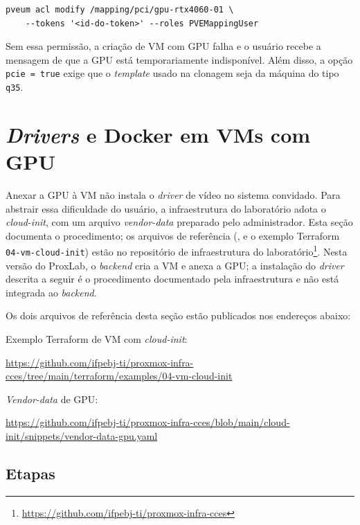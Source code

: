 \medskip
\noindent\begin{minipage}{\textwidth}
\footnotesize
\begin{verbatim}
pveum acl modify /mapping/pci/gpu-rtx4060-01 \
    --tokens '<id-do-token>' --roles PVEMappingUser
\end{verbatim}
\end{minipage}
\medskip

Sem essa permissão, a criação de VM com GPU falha e o usuário recebe a mensagem de que a GPU está temporariamente indisponível. Além disso, a opção \texttt{pcie = true} exige que o \textit{template} usado na clonagem seja da máquina do tipo \texttt{q35}.

\section{\textit{Drivers} e Docker em VMs com GPU}

Anexar a GPU à VM não instala o \textit{driver} de vídeo no sistema convidado. Para abstrair essa dificuldade do usuário, a infraestrutura do laboratório adota o \textit{cloud-init}, com um arquivo \textit{vendor-data} preparado pelo administrador. Esta seção documenta o procedimento; os arquivos de referência (,  e o exemplo Terraform \texttt{04-vm-cloud-init}) estão no repositório de infraestrutura do laboratório\footnote{\url{https://github.com/ifpebj-ti/proxmox-infra-cces}}. Nesta versão do ProxLab, o \textit{backend} cria a VM e anexa a GPU; a instalação do \textit{driver} descrita a seguir é o procedimento documentado pela infraestrutura e não está integrada ao \textit{backend}.

Os dois arquivos de referência desta seção estão publicados nos endereços abaixo:

\par Exemplo Terraform de VM com \textit{cloud-init}:
{\small\begin{center}
\url{https://github.com/ifpebj-ti/proxmox-infra-cces/tree/main/terraform/examples/04-vm-cloud-init}
\end{center}}

\par \textit{Vendor-data} de GPU:
{\small\begin{center}
\url{https://github.com/ifpebj-ti/proxmox-infra-cces/blob/main/cloud-init/snippets/vendor-data-gpu.yaml}
\end{center}}

\subsection{Etapas}

